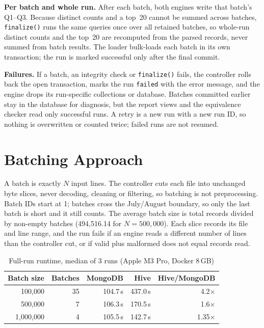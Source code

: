 \documentclass[conference]{IEEEtran}
\newcommand{\code}[1]{\texttt{\small #1}}
\begin{document}
\textbf{Per batch and whole run.} After each batch, both engines write that batch's Q1--Q3.
Because distinct counts and a top~20 cannot be summed across batches, \code{finalize()} runs
the same queries once over all retained batches, so whole-run distinct counts and the top~20
are recomputed from the parsed records, never summed from batch results. The loader
bulk-loads each batch in its own transaction; the run is marked successful only after the
final commit.

\textbf{Failures.} If a batch, an integrity check or \code{finalize()} fails, the controller
rolls back the open transaction, marks the run \code{failed} with the error message, and the
engine drops its run-specific collections or database. Batches committed earlier stay in the
database for diagnosis, but the report views and the equivalence checker read only
successful runs. A retry is a new run with a new run ID, so nothing is overwritten or
counted twice; failed runs are not resumed.

\section{Batching Approach}
A batch is exactly $N$ input lines. The controller cuts each file into unchanged byte slices,
never decoding, cleaning or filtering, so batching is not preprocessing. Batch IDs start at 1;
batches cross the July/August boundary, so only the last batch is short and it still counts.
The average batch size is total records divided by non-empty batches (494,516.14 for
$N=500{,}000$). Each slice records its file and line range, and the run fails if an engine
reads a different number of lines than the controller cut, or if valid plus malformed does not
equal records read.

\begin{table}[t]
\caption{Full-run runtime, median of 3 runs (Apple M3 Pro, Docker 8\,GB)}
\label{tab:bench}
\centering
\begin{tabular}{@{}rrrrr@{}}
\toprule
Batch size & Batches & MongoDB & Hive & Hive/MongoDB \\
\midrule
100,000   & 35 & 104.7\,s & 437.0\,s & 4.2$\times$ \\
500,000   & 7  & 106.3\,s & 170.5\,s & 1.6$\times$ \\
1,000,000 & 4  & 105.5\,s & 142.7\,s & 1.35$\times$ \\
\bottomrule
\end{tabular}
\end{table}
\end{document}
